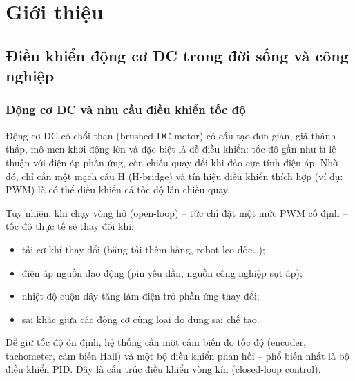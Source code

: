 \chapter{Giới thiệu}
\label{ch:gioithieu}

\section{Điều khiển động cơ DC trong đời sống và công nghiệp}

\subsection{Động cơ DC và nhu cầu điều khiển tốc độ}
Động cơ DC có chổi than (brushed DC motor) có cấu tạo đơn giản, giá thành thấp, mô-men khởi động lớn và đặc biệt là dễ điều khiển: tốc độ gần như tỉ lệ thuận với điện áp phần ứng, còn chiều quay đổi khi đảo cực tính điện áp. Nhờ đó, chỉ cần một mạch cầu H (H-bridge) và tín hiệu điều khiển thích hợp (ví dụ: PWM) là có thể điều khiển cả tốc độ lẫn chiều quay.

Tuy nhiên, khi chạy vòng hở (open-loop) -- tức chỉ đặt một mức PWM cố định -- tốc độ thực tế sẽ thay đổi khi:
\begin{itemize}
  \item tải cơ khí thay đổi (băng tải thêm hàng, robot leo dốc\ldots);
  \item điện áp nguồn dao động (pin yếu dần, nguồn công nghiệp sụt áp);
  \item nhiệt độ cuộn dây tăng làm điện trở phần ứng thay đổi;
  \item sai khác giữa các động cơ cùng loại do dung sai chế tạo.
\end{itemize}
Để giữ tốc độ ổn định, hệ thống cần một cảm biến đo tốc độ (encoder, tachometer, cảm biến Hall) và một bộ điều khiển phản hồi -- phổ biến nhất là bộ điều khiển PID. Đây là cấu trúc điều khiển vòng kín (closed-loop control).

